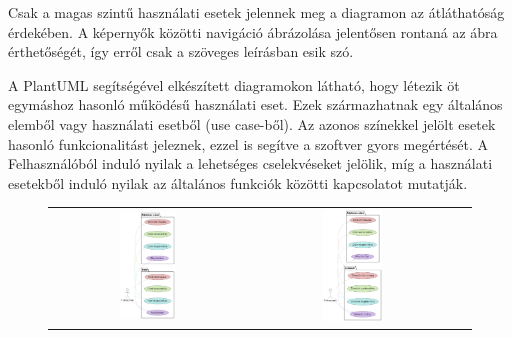 Csak a magas szintű használati esetek jelennek meg a diagramon az átláthatóság érdekében.  
A képernyők közötti navigáció ábrázolása jelentősen rontaná az ábra érthetőségét, így erről csak a szöveges leírásban esik szó.

A PlantUML segítségével elkészített diagramokon látható, hogy létezik öt egymáshoz hasonló működésű használati eset.  
Ezek származhatnak egy általános elemből vagy használati esetből (use case-ből).  
Az azonos színekkel jelölt esetek hasonló funkcionalitást jeleznek, ezzel is segítve a szoftver gyors megértését.  
A Felhasználóból induló nyilak a lehetséges cselekvéseket jelölik, míg a használati esetekből induló nyilak az általános funkciók közötti kapcsolatot mutatják.

\pagebreak

\begin{figure}[!ht]
    \centering
    \begin{tabular}{ccc} %
        \includegraphics[width=0.30\textwidth, height=0.4\textheight]{figures/Point Diagram.png} & 
        \includegraphics[width=0.30\textwidth, height=0.4\textheight]{figures/Topic Diagram.png} & 

\end{tabular}
\end{figure}
